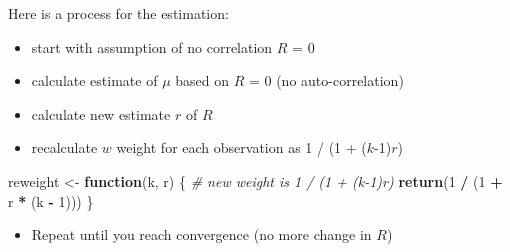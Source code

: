 \documentclass[
]{article}
\newenvironment{Shaded}{\begin{snugshade}}{\end{snugshade}}
\newcommand{\CommentTok}[1]{\textcolor[rgb]{0.56,0.35,0.01}{\textit{#1}}}
\newcommand{\ControlFlowTok}[1]{\textcolor[rgb]{0.13,0.29,0.53}{\textbf{#1}}}
\newcommand{\DecValTok}[1]{\textcolor[rgb]{0.00,0.00,0.81}{#1}}
\newcommand{\FunctionTok}[1]{\textcolor[rgb]{0.13,0.29,0.53}{\textbf{#1}}}
\newcommand{\NormalTok}[1]{#1}
\newcommand{\OtherTok}[1]{\textcolor[rgb]{0.56,0.35,0.01}{#1}}
\newcommand{\SpecialCharTok}[1]{\textcolor[rgb]{0.81,0.36,0.00}{\textbf{#1}}}
\providecommand{\tightlist}{%
  \setlength{\itemsep}{0pt}\setlength{\parskip}{0pt}}
\begin{document}
Here is a process for the estimation:

\begin{itemize}
\tightlist
\item
  start with assumption of no correlation \(R\) = 0
\item
  calculate estimate of \(\mu\) based on \(R\) = 0 (no auto-correlation)
\item
  calculate new estimate \(r\) of \(R\)
\item
  recalculate \(w\) weight for each observation as 1 / (1 +
  (\(k\)-1)\(r\))
\end{itemize}

\begin{Shaded}
\begin{Highlighting}[]
\NormalTok{reweight }\OtherTok{\textless{}{-}} \ControlFlowTok{function}\NormalTok{(k, r) \{}
    \CommentTok{\# new weight is 1 / (1 + (k{-}1)r)}
    \FunctionTok{return}\NormalTok{(}\DecValTok{1} \SpecialCharTok{/}\NormalTok{ (}\DecValTok{1} \SpecialCharTok{+}\NormalTok{ r }\SpecialCharTok{*}\NormalTok{ (k }\SpecialCharTok{{-}} \DecValTok{1}\NormalTok{)))}
\NormalTok{\}}
\end{Highlighting}
\end{Shaded}

\begin{itemize}
\tightlist
\item
  Repeat until you reach convergence (no more change in \(R\))
\end{itemize}
\end{document}
